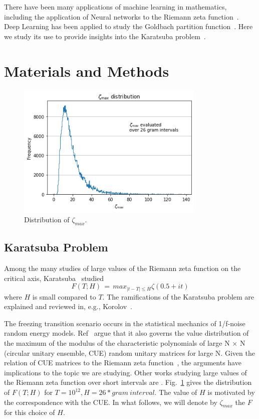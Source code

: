 \documentclass[twoside]{article}
\begin{document}
 There have been many applications of machine learning in mathematics, including 
the application of Neural networks to the Riemann zeta function~\cite{osneural}.
Deep Learning has been applied to study the Goldbach partition function~\cite{kim2022}.
Here we study its use to provide insights into  the Karatsuba problem~\cite{K5, Kor1}.


\section{\label{sec2}Materials and Methods}

\begin{figure}
\centering
\includegraphics[width=0.8\textwidth]{1.png}
\caption[]{ 
  Distribution of $\zeta_{max}$. 
  }
\vspace{1mm}
\label{z1}
\end{figure}

\subsection{\label{seckaratsuba}Karatsuba Problem}

Among the many studies of large values of the Riemann zeta function on the critical axis, Karatsuba~\cite{K5} studied 
\begin{equation}
F(T; H)  \, = \, max_{|t-T| \le H} \zeta ( 0.5+it ) 
\label{eqRie}
\end{equation}
where $H$ is small compared to $T$. The ramifications of the Karatsuba problem are explained and
reviewed in, e.g.,  Korolov~\cite{Kor1}.  

The freezing transition scenario occurs in the statistical mechanics of 1/f-noise random energy models. Ref~\cite{FK} argue that it  also governs the value distribution of the maximum of the modulus of the characteristic polynomials  of large N × N (circular unitary ensemble, CUE) random unitary  matrices for large N.  Given the relation of CUE matrices to the Riemann zeta function~\cite{oscue}, the arguments have implications to the topic we are studying. Other works studying large values of the Riemann zeta function over short intervals are \cite{Feng, Tihanyi, FTH, Ivic}. Fig.~\ref{z1} gives the distribution of $F(T; H)$ for $T=10^{12}, H=26*gram~interval$.  The value of $H$ is motivated by the correspondence with the CUE. In what follows, we will denote by $\zeta_{max}$ the $F$ for this choice of $H$.
\end{document}
